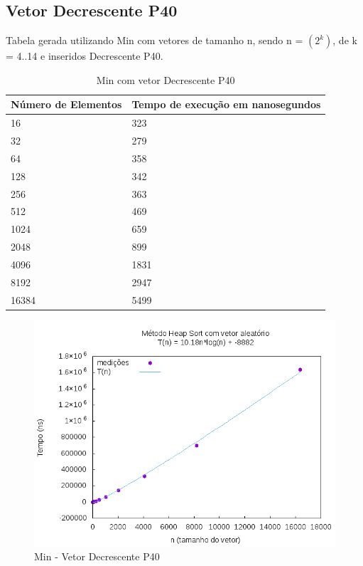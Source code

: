 \documentclass[12pt,a4paper,twoside]{report}
\begin{document}
\subsection{Vetor Decrescente P40}
Tabela gerada utilizando Min com vetores de tamanho n, sendo n = $(2^k)$, de k = 4..14 e inseridos Decrescente P40.
\begin{table}[H]
\centering
\caption{Min com vetor Decrescente P40}
\label{my-label}
\begin{tabular}{|l|l|}
\hline
\multicolumn{1}{|c|}{\textbf{Número de Elementos}} & \multicolumn{1}{c|}{\textbf{Tempo de execução em nanosegundos}} \\ \hline
16 & 323 \\ \hline
32 & 279 \\ \hline
64 & 358 \\ \hline
128 & 342 \\ \hline
256 & 363 \\ \hline
512 & 469 \\ \hline
1024 & 659 \\ \hline
2048 & 899 \\ \hline
4096 & 1831 \\ \hline
8192 & 2947 \\ \hline
16384 & 5499 \\ \hline

\end{tabular}
\end{table}

\begin{figure}[H]
    \centering
    \includegraphics[width=0.7\linewidth]{graficos/HeapSort/vIntAleatorio/vIntAleatorio.png}
  \caption{Min - Vetor Decrescente P40}
\end{figure}
\end{document}
